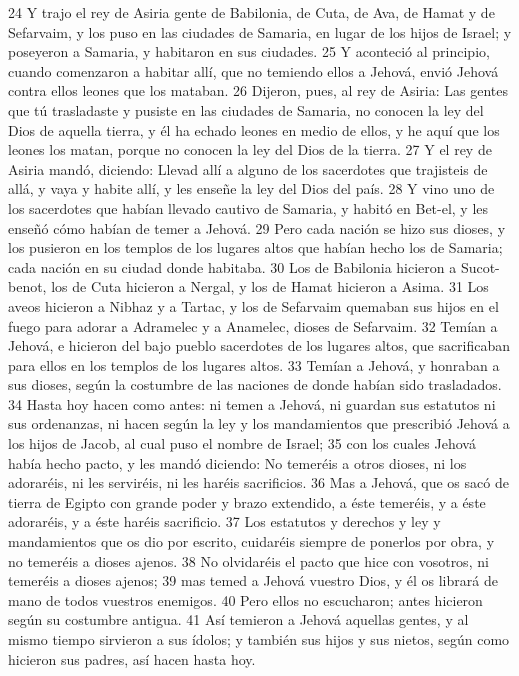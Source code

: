 24 Y trajo el rey de Asiria gente de Babilonia, de Cuta, de Ava, de Hamat y de Sefarvaim, y los puso en las ciudades de Samaria, en lugar de los hijos de Israel; y poseyeron a Samaria, y habitaron en sus ciudades.
25 Y aconteció al principio, cuando comenzaron a habitar allí, que no temiendo ellos a Jehová, envió Jehová contra ellos leones que los mataban.
26 Dijeron, pues, al rey de Asiria: Las gentes que tú trasladaste y pusiste en las ciudades de Samaria, no conocen la ley del Dios de aquella tierra, y él ha echado leones en medio de ellos, y he aquí que los leones los matan, porque no conocen la ley del Dios de la tierra.
27 Y el rey de Asiria mandó, diciendo: Llevad allí a alguno de los sacerdotes que trajisteis de allá, y vaya y habite allí, y les enseñe la ley del Dios del país.
28 Y vino uno de los sacerdotes que habían llevado cautivo de Samaria, y habitó en Bet-el, y les enseñó cómo habían de temer a Jehová.
29 Pero cada nación se hizo sus dioses, y los pusieron en los templos de los lugares altos que habían hecho los de Samaria; cada nación en su ciudad donde habitaba.
30 Los de Babilonia hicieron a Sucot-benot, los de Cuta hicieron a Nergal, y los de Hamat hicieron a Asima.
31 Los aveos hicieron a Nibhaz y a Tartac, y los de Sefarvaim quemaban sus hijos en el fuego para adorar a Adramelec y a Anamelec, dioses de Sefarvaim.
32 Temían a Jehová, e hicieron del bajo pueblo sacerdotes de los lugares altos, que sacrificaban para ellos en los templos de los lugares altos.
33 Temían a Jehová, y honraban a sus dioses, según la costumbre de las naciones de donde habían sido trasladados.
34 Hasta hoy hacen como antes: ni temen a Jehová, ni guardan sus estatutos ni sus ordenanzas, ni hacen según la ley y los mandamientos que prescribió Jehová a los hijos de Jacob, al cual puso el nombre de Israel; 
35 con los cuales Jehová había hecho pacto, y les mandó diciendo: No temeréis a otros dioses, ni los adoraréis, ni les serviréis, ni les haréis sacrificios. 
36 Mas a Jehová, que os sacó de tierra de Egipto con grande poder y brazo extendido, a éste temeréis, y a éste adoraréis, y a éste haréis sacrificio.
37 Los estatutos y derechos y ley y mandamientos que os dio por escrito, cuidaréis siempre de ponerlos por obra, y no temeréis a dioses ajenos.
38 No olvidaréis el pacto que hice con vosotros, ni temeréis a dioses ajenos;
39 mas temed a Jehová vuestro Dios, y él os librará de mano de todos vuestros enemigos.
40 Pero ellos no escucharon; antes hicieron según su costumbre antigua.
41 Así temieron a Jehová aquellas gentes, y al mismo tiempo sirvieron a sus ídolos; y también sus hijos y sus nietos, según como hicieron sus padres, así hacen hasta hoy.

